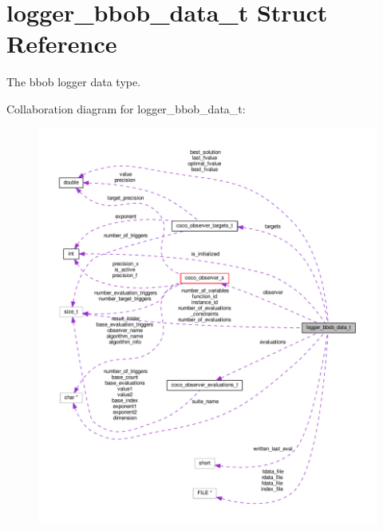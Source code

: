 \hypertarget{structlogger__bbob__data__t}{}\section{logger\+\_\+bbob\+\_\+data\+\_\+t Struct Reference}
\label{structlogger__bbob__data__t}


The bbob logger data type.  




Collaboration diagram for logger\+\_\+bbob\+\_\+data\+\_\+t\+:\nopagebreak
\begin{figure}[H]
\begin{center}
\leavevmode
\includegraphics[width=350pt]{structlogger__bbob__data__t__coll__graph}
\end{center}
\end{figure}
